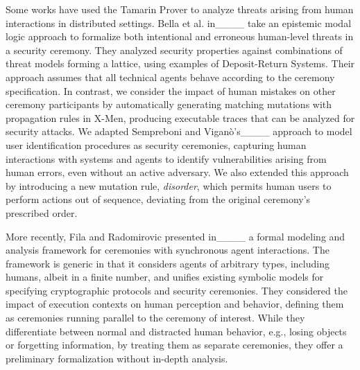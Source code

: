 Some works have used the Tamarin Prover to analyze threats arising from human interactions in distributed settings. Bella et al. in____ take an epistemic modal logic approach to formalize both intentional and erroneous human-level threats in a security ceremony. They analyzed security properties against combinations of threat models forming a lattice, using examples of Deposit-Return Systems. Their approach assumes that all technical agents behave according to the ceremony specification. In contrast, we consider the impact of human mistakes on other ceremony participants by automatically generating matching mutations with propagation rules in X-Men, producing executable traces that can be analyzed for security attacks. We adapted Sempreboni and Viganò's____ approach to model user identification procedures as security ceremonies, capturing human interactions with systems and agents to identify vulnerabilities arising from human errors, even without an active adversary. We also extended this approach by introducing a new mutation rule, \emph{disorder}, which permits human users to perform actions out of sequence, deviating from the original ceremony's prescribed order.

More recently, Fila and Radomirovic presented in____ a formal modeling and analysis framework for ceremonies with synchronous agent interactions. The framework is generic in that it considers agents of arbitrary types, including humans, albeit in a finite number, and unifies existing symbolic models for specifying cryptographic protocols and security ceremonies. They considered the impact of execution contexts on human perception and behavior, defining them as ceremonies running parallel to the ceremony of interest. While they differentiate between normal and distracted human behavior, e.g., losing objects or forgetting information, by treating them as separate ceremonies, they offer a preliminary formalization without in-depth analysis.
